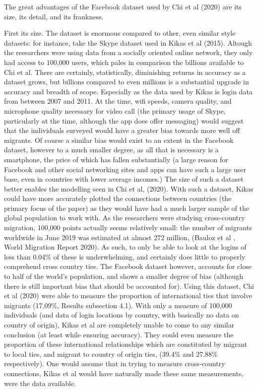 \documentclass[12pt]{article}
\begin{document}
The great advantages of the Facebook dataset used by Chi et al (2020) are its size, 
its detail, and its frankness. 

First its size. The dataset is enormous compared to other, even similar style datasets: 
for instance, take the Skype dataset used in Kikas et al (2015). Altough the researchers 
were using data from a socially oriented online network, they only had access to 100,000 
users, which pales in comparison the billions available to Chi et al. There are 
certainly, statistically, diminishing returns in accuracy as a dataset grows, but billions 
compared to even millions is a substantial upgrade in accuracy and breadth of scope. 
Especially as the data used by Kikas is login data from between 2007 and 2011. At the time, 
wifi speeds, camera quality, and microphone quality necessary for video call (the primary 
usage of Skype, particularly at the time, although the app does offer messaging) would
suggest that the individuals surveyed would have a greater bias towards more well off 
migrants. Of course a similar bias would exist to an extent in the Facebook dataset, 
however to a much smaller degree, as all that is necessary is a smartphone, the price of 
which has fallen substantially (a large reason for Facebook and other social networking 
sites and apps can have such a large user base, even in countries with lower average incomes.)
The size of such a dataset better enables the modelling seen in Chi et al, (2020). With such 
a dataset, Kikas could have more accurately plotted the connections between countries (the 
primary focus of the paper) as they would have had a much larger sample of the global 
population to work with. As the researchers were studying cross-country migration, 
100,000 points actually seems relatively small: the number of migrants worldwide in June 2019
was estimated at almost 272 million, (Bauloz et al , World Migration Report 2020). As such, 
to only be able to look at the logins of less than 0.04\% of these is underwhelming, 
and certainly does little to properly comprehend cross country ties. The Facebook dataset 
however, accounts for close to half of the world's population, and shows a smaller degree 
of bias (although there is still important bias that should be accounted for). Using this 
dataset, Chi et al (2020) were able to measure the proportion of international ties that 
involve migrants (17.09\%, Results subsection 4.1). With only a measure of 100,000 
individuals (and data of login locations by country, with basically no data on country 
of origin), Kikas et al are completely unable to come to any similar conclusion (at least 
while ensuring accuracy). They could even measure the proportion of these international 
relationships which are constituted by migrant to local ties, and migrant to country of origin 
ties, (39.4\% and 27.88\% respectively). One would assume that in trying to measure cross-country 
connections, Kikas et al would have naturally made these same measurements, were the data 
available. 
\end{document}
